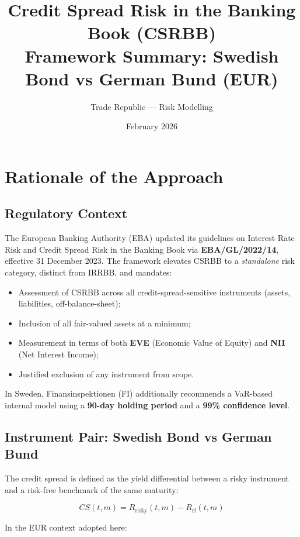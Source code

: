 \documentclass[11pt, a4paper]{article}
\title{
    \textbf{Credit Spread Risk in the Banking Book (CSRBB)} \\[0.5em]
    \large Framework Summary: Swedish Bond vs German Bund (EUR)
}
\author{Trade Republic — Risk Modelling}
\date{February 2026}
\begin{document}
\maketitle
\tableofcontents
\newpage

\section{Rationale of the Approach}

\subsection{Regulatory Context}

The European Banking Authority (EBA) updated its guidelines on Interest Rate Risk and Credit Spread Risk in the Banking Book via \textbf{EBA/GL/2022/14}, effective 31 December 2023. The framework elevates CSRBB to a \textit{standalone} risk category, distinct from IRRBB, and mandates:

\begin{itemize}[noitemsep]
    \item Assessment of CSRBB across all credit-spread-sensitive instruments (assets, liabilities, off-balance-sheet);
    \item Inclusion of all fair-valued assets at a minimum;
    \item Measurement in terms of both \textbf{EVE} (Economic Value of Equity) and \textbf{NII} (Net Interest Income);
    \item Justified exclusion of any instrument from scope.
\end{itemize}

In Sweden, Finansinspektionen (FI) additionally recommends a VaR-based internal model using a \textbf{90-day holding period} and a \textbf{99\% confidence level}.

\subsection{Instrument Pair: Swedish Bond vs German Bund}

The credit spread is defined as the yield differential between a risky instrument and a risk-free benchmark of the same maturity:

\[
    CS(t, m) = R_{\text{risky}}(t, m) - R_{\text{rf}}(t, m)
\]

In the EUR context adopted here:
\end{document}
